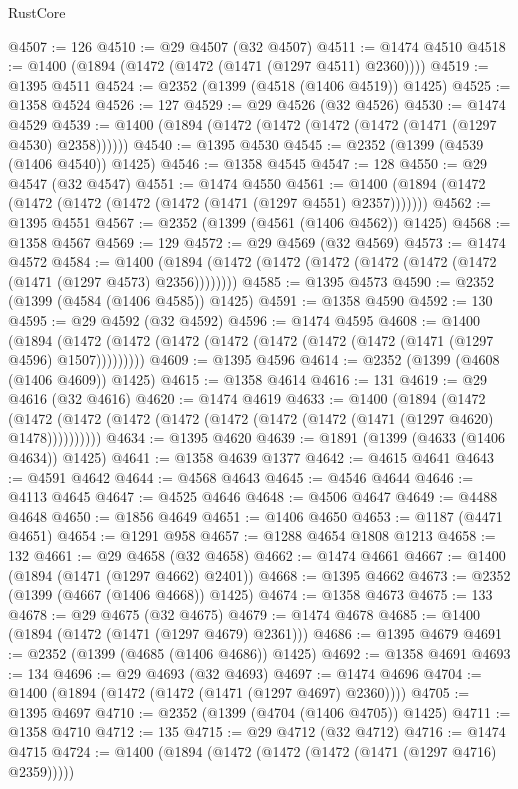 \begin{lexlean}{RustCore}
\begin{coremodule}
@4507 := 126
@4510 := @29 @4507 (@32 @4507)
@4511 := @1474 @4510
@4518 := @1400 (@1894 (@1472 (@1472 (@1471 (@1297 @4511) @2360))))
@4519 := @1395 @4511
@4524 := @2352 (@1399 (@4518 (@1406 @4519)) @1425)
@4525 := @1358 @4524
@4526 := 127
@4529 := @29 @4526 (@32 @4526)
@4530 := @1474 @4529
@4539 := @1400 (@1894 (@1472 (@1472 (@1472 (@1472 (@1471 (@1297 @4530) @2358))))))
@4540 := @1395 @4530
@4545 := @2352 (@1399 (@4539 (@1406 @4540)) @1425)
@4546 := @1358 @4545
@4547 := 128
@4550 := @29 @4547 (@32 @4547)
@4551 := @1474 @4550
@4561 := @1400 (@1894 (@1472 (@1472 (@1472 (@1472 (@1472 (@1471 (@1297 @4551) @2357)))))))
@4562 := @1395 @4551
@4567 := @2352 (@1399 (@4561 (@1406 @4562)) @1425)
@4568 := @1358 @4567
@4569 := 129
@4572 := @29 @4569 (@32 @4569)
@4573 := @1474 @4572
@4584 := @1400 (@1894 (@1472 (@1472 (@1472 (@1472 (@1472 (@1472 (@1471 (@1297 @4573) @2356))))))))
@4585 := @1395 @4573
@4590 := @2352 (@1399 (@4584 (@1406 @4585)) @1425)
@4591 := @1358 @4590
@4592 := 130
@4595 := @29 @4592 (@32 @4592)
@4596 := @1474 @4595
@4608 := @1400
    (@1894 (@1472 (@1472 (@1472 (@1472 (@1472 (@1472 (@1472 (@1471 (@1297 @4596) @1507)))))))))
@4609 := @1395 @4596
@4614 := @2352 (@1399 (@4608 (@1406 @4609)) @1425)
@4615 := @1358 @4614
@4616 := 131
@4619 := @29 @4616 (@32 @4616)
@4620 := @1474 @4619
@4633 := @1400
    (@1894
      (@1472 (@1472 (@1472 (@1472 (@1472 (@1472 (@1472 (@1472 (@1471 (@1297 @4620) @1478))))))))))
@4634 := @1395 @4620
@4639 := @1891 (@1399 (@4633 (@1406 @4634)) @1425)
@4641 := @1358 @4639 @1377
@4642 := @4615 @4641
@4643 := @4591 @4642
@4644 := @4568 @4643
@4645 := @4546 @4644
@4646 := @4113 @4645
@4647 := @4525 @4646
@4648 := @4506 @4647
@4649 := @4488 @4648
@4650 := @1856 @4649
@4651 := @1406 @4650
@4653 := @1187 (@4471 @4651)
@4654 := @1291 @958
@4657 := @1288 @4654 @1808 @1213
@4658 := 132
@4661 := @29 @4658 (@32 @4658)
@4662 := @1474 @4661
@4667 := @1400 (@1894 (@1471 (@1297 @4662) @2401))
@4668 := @1395 @4662
@4673 := @2352 (@1399 (@4667 (@1406 @4668)) @1425)
@4674 := @1358 @4673
@4675 := 133
@4678 := @29 @4675 (@32 @4675)
@4679 := @1474 @4678
@4685 := @1400 (@1894 (@1472 (@1471 (@1297 @4679) @2361)))
@4686 := @1395 @4679
@4691 := @2352 (@1399 (@4685 (@1406 @4686)) @1425)
@4692 := @1358 @4691
@4693 := 134
@4696 := @29 @4693 (@32 @4693)
@4697 := @1474 @4696
@4704 := @1400 (@1894 (@1472 (@1472 (@1471 (@1297 @4697) @2360))))
@4705 := @1395 @4697
@4710 := @2352 (@1399 (@4704 (@1406 @4705)) @1425)
@4711 := @1358 @4710
@4712 := 135
@4715 := @29 @4712 (@32 @4712)
@4716 := @1474 @4715
@4724 := @1400 (@1894 (@1472 (@1472 (@1472 (@1471 (@1297 @4716) @2359)))))

\end{coremodule}
\end{lexlean}
